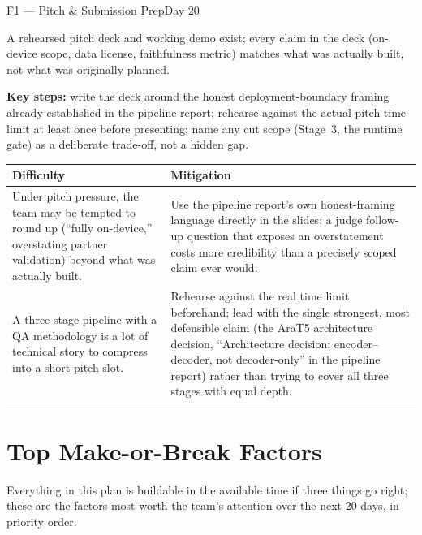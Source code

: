 \documentclass[11pt,a4paper]{article}
\begin{document}
\begin{milestonehead}{F1 --- Pitch \& Submission Prep}{Day 20}
\begin{goalbox}
A rehearsed pitch deck and working demo exist; every claim in the deck
(on-device scope, data license, faithfulness metric) matches what was
actually built, not what was originally planned.
\end{goalbox}

\textbf{Key steps:} write the deck around the honest deployment-boundary
framing already established in the pipeline report; rehearse against the
actual pitch time limit at least once before presenting; name any cut scope
(Stage~3, the runtime gate) as a deliberate trade-off, not a hidden gap.

\begin{center}
\small
\begin{tabular}{@{}p{6.3cm}p{6.9cm}@{}}
\toprule
\textbf{Difficulty} & \textbf{Mitigation} \\
\midrule
Under pitch pressure, the team may be tempted to round up (``fully
on-device,'' overstating partner validation) beyond what was actually
built. & Use the pipeline report's own honest-framing language directly in
the slides; a judge follow-up question that exposes an overstatement costs
more credibility than a precisely scoped claim ever would. \\
\addlinespace
A three-stage pipeline with a QA methodology is a lot of technical story to
compress into a short pitch slot. & Rehearse against the real time limit
beforehand; lead with the single strongest, most defensible claim (the
AraT5 architecture decision, ``Architecture decision: encoder--decoder,
not decoder-only'' in the pipeline report) rather than trying to cover all
three stages with equal depth. \\
\bottomrule
\end{tabular}
\end{center}
\end{milestonehead}

\newpage
\section{Top Make-or-Break Factors}
\label{sec:top-risks}

Everything in this plan is buildable in the available time if three things
go right; these are the factors most worth the team's attention over the
next 20 days, in priority order.
\end{document}
